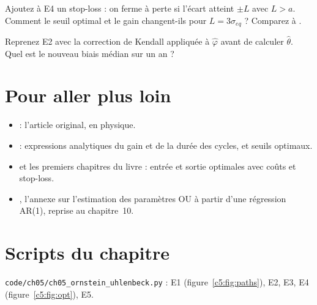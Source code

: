 \begin{exercise}[à coder]
Ajoutez à E4 un stop-loss : on ferme à perte si l'écart atteint $\pm L$ avec $L > a$. Comment le seuil optimal et le gain changent-ils pour $L = 3\sigma_{eq}$ ? Comparez à \citet{leungli2015}.
\end{exercise}

\begin{exercise}[à coder]
Reprenez E2 avec la correction de Kendall appliquée à $\hat\varphi$ avant de calculer $\hat\theta$. Quel est le nouveau biais médian sur un an ?
\end{exercise}

\section{Pour aller plus loin}

\begin{toread}
\begin{itemize}[leftmargin=1.2em]
\item \citet{uhlenbeck1930} : l'article original, en physique.
\item \citet{bertram2010} : expressions analytiques du gain et de la durée des cycles, et seuils optimaux.
\item \citet{leungli2015} et les premiers chapitres du livre \citet{leungli2016} : entrée et sortie optimales avec coûts et stop-loss.
\item \citet{avellaneda2010}, l'annexe sur l'estimation des paramètres OU à partir d'une régression AR(1), reprise au chapitre~10.
\end{itemize}
\end{toread}

\section{Scripts du chapitre}
\noindent\texttt{code/ch05/ch05\_ornstein\_uhlenbeck.py} : E1 (figure~\ref{c5:fig:paths}), E2, E3, E4 (figure~\ref{c5:fig:opt}), E5.
